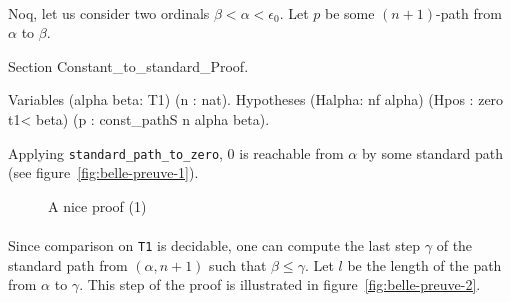 \paragraph*{}
Noq, let us consider two ordinals  $\beta<\alpha<\epsilon_0$.  Let $p$  be some $(n+1)$-path from $\alpha$ to $\beta$.

\begin{Coqsrc}
 Section Constant_to_standard_Proof.

  Variables (alpha beta: T1) (n : nat).
  Hypotheses (Halpha: nf alpha) (Hpos : zero t1<  beta)
             (p : const_pathS n alpha  beta).
\end{Coqsrc}

Applying \texttt{standard\_path\_to\_zero}, $0$ is reachable from $\alpha$ by some standard path  (see figure~\vref{fig:belle-preuve-1}).

\begin{figure}[h]
  \centering
 
\caption{A nice proof (1)}
  \label{fig:belle-preuve-1}
\end{figure}


\paragraph*{}




Since comparison on \texttt{T1} is decidable, one can compute the last step $\gamma$ of the standard path from $(\alpha,n+1)$  such that $\beta\leq \gamma$.
Let $l$ be the length of the path from $\alpha$ to $\gamma$.  
This step of the proof is illustrated in figure~\vref{fig:belle-preuve-2}.



